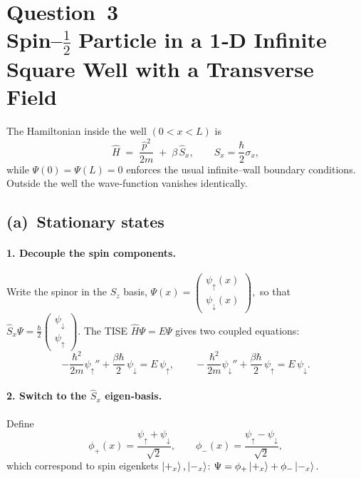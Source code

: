 \documentclass[12pt]{article}
\begin{document}
\bigskip



\section*{Question 3 \\ Spin–\(\tfrac12\) Particle in a 1‑D Infinite Square Well with a Transverse Field}

The Hamiltonian inside the well \((0<x<L)\) is
\[
  \hat H \;=\;
  \frac{\hat p^{2}}{2m}\;+\;\beta\,\hat S_x,
  \qquad
  \hat S_x=\frac{\hbar}{2}\sigma_x,
\]
while \(\Psi(0)=\Psi(L)=0\) enforces the usual infinite–wall boundary
conditions.  Outside the well the wave‑function vanishes identically.

\subsection*{(a) Stationary states}

\paragraph{1.  Decouple the spin components.}
Write the spinor in the \(S_z\) basis,
\(
  \Psi(x)=\!
    \begin{pmatrix}\psi_\uparrow(x)\\[2pt]\psi_\downarrow(x)\end{pmatrix},
\)
so that
\(
  \hat S_x\Psi
  =\frac{\hbar}{2}
    \begin{pmatrix}\psi_\downarrow \\ \psi_\uparrow\end{pmatrix}.
\)
The TISE \(\hat H\Psi = E\Psi\) gives two coupled equations:
\[
  -\frac{\hbar^{2}}{2m}\psi_\uparrow'' + \frac{\beta\hbar}{2}\,\psi_\downarrow
  = E\,\psi_\uparrow,
  \qquad
  -\frac{\hbar^{2}}{2m}\psi_\downarrow'' + \frac{\beta\hbar}{2}\,\psi_\uparrow
  = E\,\psi_\downarrow.
\]

\paragraph{2.  Switch to the \(\hat S_x\) eigen‑basis.}
Define
\[
  \phi_{+}(x)=\frac{\psi_\uparrow+\psi_\downarrow}{\sqrt2},\qquad
  \phi_{-}(x)=\frac{\psi_\uparrow-\psi_\downarrow}{\sqrt2},
\]
which correspond to spin eigenkets
\(\ket{+_x},\ket{-_x}\):
\(
  \Psi = \phi_{+}\ket{+_x}+\phi_{-}\ket{-_x}.
\)
\end{document}
